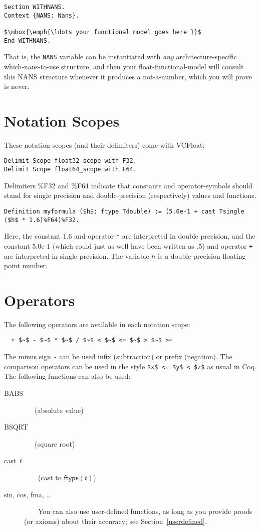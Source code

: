 \documentclass[article]{memoir}
\begin{document}
\begin{lstlisting}
Section WITHNANS.
Context {NANS: Nans}.

$\mbox{\emph{\ldots your functional model goes here }}$
End WITHNANS.
\end{lstlisting}
That is, the \lstinline{NANS} variable can be instantiated with
\emph{any} architecture-specific which-nans-to-use structure,
and then your float-functional-model will consult this NANS
structure whenever it produces a not-a-number, which you will prove
is never.

\chapter{Notation Scopes}
These notation scopes (and their delimiters) come with VCFloat:
\begin{lstlisting}
Delimit Scope float32_scope with F32.
Delimit Scope float64_scope with F64.
\end{lstlisting}

Delimiters \%F32 and \%F64 indicate that constants and operator-symbols should stand for single precision and double-precision (respectively) values and functions.
\begin{lstlisting}
Definition myformula ($h$: ftype Tdouble) := (5.0e-1 + cast Tsingle ($h$ * 1.6)%F64)%F32.
\end{lstlisting}
Here, the constant 1.6 and operator \lstinline{*} are
interpreted in double precision,
and the constant 5.0e-1 (which could just as well have been written
as .5) and operator \lstinline{+} are interpreted in single precision.
The variable $h$ is a double-precision floating-point number.

\chapter{Operators}
The following operators are available in each notation scope:
\begin{lstlisting}
  + $~$ - $~$ * $~$ / $~$ < $~$ <= $~$ > $~$ >= 
\end{lstlisting}
The minus sign \lstinline{-} can be used infix (subtraction) or prefix (negation).  The comparison operators can be used in the style
\lstinline{$x$ <= $y$ < $z$} as usual in Coq.
The following functions can also be used:
\begin{description}
\item[\textsf{BABS}]  ~~~(absolute value)
\item[\textsf{BSQRT}]  ~~~(square root)
\item[\textsf{cast~$t$}]  ~~~~(cast to $\mathsf{ftype}(t)$)
\item[sin, cos, fma, \ldots] ~~~~You can also use user-defined functions, as long as you provide proofs (or axioms) about
their accuracy; see Section~\ref{userdefined}.
\end{description}
\end{document}
